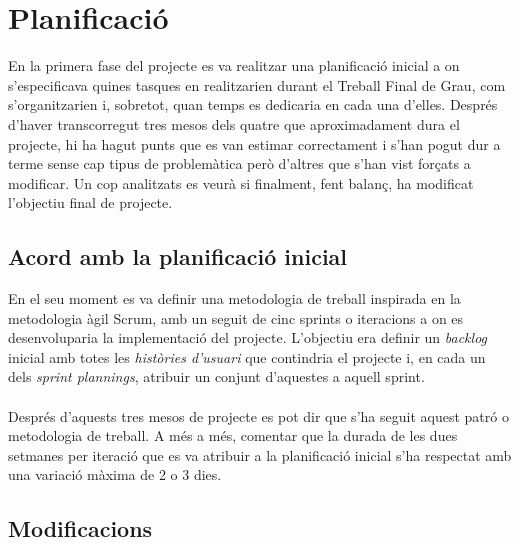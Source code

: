 
\chapter{Planificació} %

\label{Chapter3} %

En la primera fase del projecte es va realitzar una planificació inicial a on s'especificava quines tasques en realitzarien durant el Treball Final de Grau, com s'organitzarien i, sobretot, quan temps es dedicaria en cada una d'elles. Després d'haver transcorregut tres mesos dels quatre que aproximadament dura el projecte, hi ha hagut punts que es van estimar correctament i s'han pogut dur a terme sense cap tipus de problemàtica però d'altres que s'han vist forçats a modificar. Un cop analitzats es veurà si finalment, fent balanç, ha modificat l'objectiu final de projecte.

\section{Acord amb la planificació inicial}

En el seu moment es va definir una metodologia de treball inspirada en la metodologia àgil Scrum, amb un seguit de cinc sprints o iteracions a on es desenvoluparia la implementació del projecte. L'objectiu era definir un \textit{backlog} inicial amb totes les \textit{històries d'usuari} que contindria el projecte i, en cada un dels \textit{sprint plannings}, atribuir un conjunt d'aquestes a aquell sprint.
\\\\
Després d'aquests tres mesos de projecte es pot dir que s'ha seguit aquest patró o metodologia de treball. A més a més, comentar que la durada de les dues setmanes per iteració que es va atribuir a la planificació inicial s'ha respectat amb una variació màxima de 2 o 3 dies.


\section{Modificacions}

